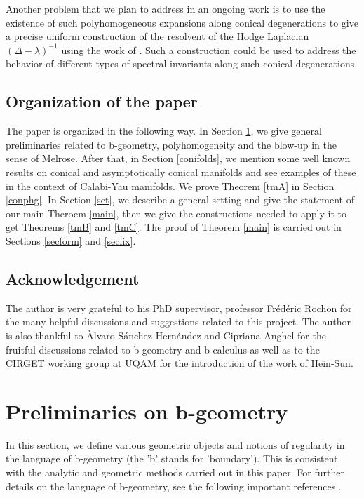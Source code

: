 \documentclass[a4paper,11pt]{article}
\begin{document}
Another problem that we plan to address in an ongoing work is to use the existence of such polyhomogeneous expansions along conical degenerations to give a precise uniform construction of the resolvent of the Hodge Laplacian $(\Delta - \lambda)^{-1}$ using the work of \cite{Albin}. Such a construction could be used to address the behavior of different types of spectral invariants along such conical degenerations.

\subsection{Organization of the paper}
The paper is organized in the following way. In Section \ref{prel}, we give general preliminaries related to b-geometry, polyhomogeneity and the blow-up in the sense of Melrose. After that, in Section \ref{conifolds}, we mention some well known results on conical and asymptotically conical manifolds and see examples of these in the context of Calabi-Yau manifolds. We prove Theorem \ref{tmA} in Section \ref{conphg}. In Section \ref{set}, we describe a general setting and give the statement of our main Theroem \ref{main}, then we give the constructions needed to apply it to get Theorems \ref{tmB} and \ref{tmC}. The proof of Theorem \ref{main} is carried out in Sections \ref{secform} and \ref{secfix}. 
\subsection*{Acknowledgement} The author is very grateful to his PhD supervisor, professor Frédéric Rochon for the many helpful discussions and suggestions related to this project. The author is also thankful to Àlvaro Sánchez Hernández and Cipriana Anghel for the fruitful discussions related to b-geometry and b-calculus as well as to the CIRGET working group at UQAM for the introduction of the work of Hein-Sun.
\section{Preliminaries on b-geometry } \label{prel}
In this section, we define various geometric objects and notions of regularity in the language of b-geometry (the 'b' stands for 'boundary'). This is consistent with the analytic and geometric methods carried out in this paper. For further details on the language of b-geometry, see the following important references \cite{melrose_atiyah-patodi-singer_1993, grieser2017scalesblowupquasimodeconstructions, melrose_calculus_1992, melrose_pseudodifferential_1990, melrose1996differential}. 
\end{document}
